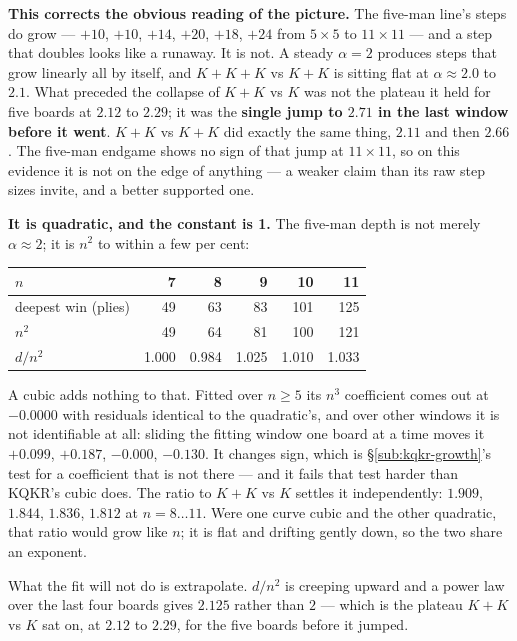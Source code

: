 \documentclass[11pt]{article}
\begin{document}
\noindent
\textbf{This corrects the obvious reading of the picture.} The five-man line's
steps do grow --- $+10$, $+10$, $+14$, $+20$, $+18$, $+24$ from $5\times5$ to
$11\times11$ --- and a step that doubles looks like a runaway. It is not. A
steady $\alpha = 2$ produces steps that grow linearly all by itself, and
$K\!+\!K\!+\!K$ vs $K\!+\!K$ is sitting flat at $\alpha \approx 2.0$ to $2.1$.
What preceded the collapse of $K\!+\!K$ vs $K$ was not the plateau it held for
five boards at $2.12$ to $2.29$; it was the \textbf{single jump to $2.71$ in
the last window before it went}. $K\!+\!K$ vs $K\!+\!K$ did exactly the same
thing, $2.11$ and then $2.66$. The five-man endgame shows no sign of that jump
at $11\times11$, so on this evidence it is not on the edge of anything --- a
weaker claim than its raw step sizes invite, and a better supported one.

\textbf{It is quadratic, and the constant is 1.} The five-man depth is not
merely $\alpha \approx 2$; it is $n^{2}$ to within a few per cent:

\begin{center}\small
\begin{tabular}{@{}lrrrrr@{}}
\toprule
$n$ & 7 & 8 & 9 & 10 & 11\\
\midrule
deepest win (plies) & 49 & 63 & 83 & 101 & 125\\
$n^{2}$             & 49 & 64 & 81 & 100 & 121\\
$d/n^{2}$           & 1.000 & 0.984 & 1.025 & 1.010 & 1.033\\
\bottomrule
\end{tabular}
\end{center}

\noindent
A cubic adds nothing to that. Fitted over $n \ge 5$ its $n^{3}$ coefficient
comes out at $-0.0000$ with residuals identical to the quadratic's, and over
other windows it is not identifiable at all: sliding the fitting window one
board at a time moves it $+0.099$, $+0.187$, $-0.000$, $-0.130$. It changes
sign, which is \S\ref{sub:kqkr-growth}'s test for a coefficient that is not
there --- and it fails that test harder than KQKR's cubic does. The ratio to
$K\!+\!K$ vs $K$ settles it independently: $1.909$, $1.844$, $1.836$, $1.812$
at $n = 8 \ldots 11$. Were one curve cubic and the other quadratic, that ratio
would grow like $n$; it is flat and drifting gently down, so the two share an
exponent.

What the fit will not do is extrapolate. $d/n^{2}$ is creeping upward and a
power law over the last four boards gives $2.125$ rather than $2$ --- which is
the plateau $K\!+\!K$ vs $K$ sat on, at $2.12$ to $2.29$, for the five boards
before it jumped.
\end{document}
